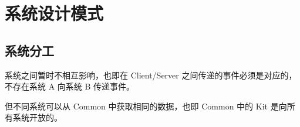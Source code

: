 \section{系统设计模式}

\subsection{系统分工}

系统之间暂时不相互影响，也即在 Client/Server 之间传递的事件必须是对应的，不存在系统 A 向系统 B 传递事件。

但不同系统可以从 Common 中获取相同的数据，也即 Common 中的 Kit 是向所有系统开放的。
